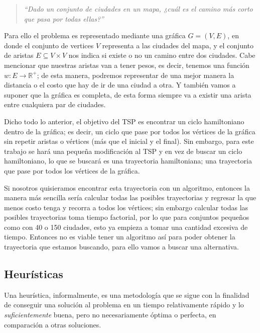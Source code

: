 \documentclass{article}
\newcommand{\tit}[1]{\textit{#1}}
\begin{document}
  \begin{quote}
    \tit{``Dado un conjunto de ciudades en un mapa, ¿cuál es el camino 
      más corto que pasa por todas ellas?''}
  \end{quote}

  Para ello el problema es representado mediante una gráfica $G = (V, E)$, 
  en donde  el conjunto de vertices $V$ representa a las ciudades del mapa, 
  y el conjunto de aristas $E \subseteq V \times V$ nos indica si existe 
  o no un camino entre dos ciudades. Cabe mencionar que nuestras aristas 
  van a tener pesos, es decir, tenemos una función 
  $w: E \rightarrow \mathbb{R}^+$; de esta manera, podremos representar 
  de una mejor manera la distancia o el costo que hay de ir de una ciudad 
  a otra. Y también vamos a suponer que la gráfica es completa, de 
  esta forma siempre va a existir una arista entre cualquiera par de 
  ciudades.

  Dicho todo lo anterior, el objetivo del TSP es encontrar un ciclo 
  hamiltoniano dentro de la gráfica; es decir, un ciclo que pase por 
  todos los vértices de la gráfica sin repetir aristas o vértices 
  (más que el inicial y el final). Sin embargo, para este trabajo se 
  hará una pequeña modificación al TSP y en vez de buscar un ciclo 
  hamiltoniano, lo que se buscará es una trayectoria hamiltoniana; una 
  trayectoria que pase por todos los vértices de la gráfica.

  Si nosotros quisieramos encontrar esta trayectoria con un algoritmo,
  entonces la manera más sencilla sería calcular todas las 
  posibles trayectorias y regresar la que menos costo tenga y 
  recorra a todos los vértices; sin embargo calcular todas las posibles 
  trayectorias toma tiempo factorial, por lo que para conjuntos pequeños 
  como con 40 o 150 ciudades, esto ya empieza a tomar una cantidad 
  excesiva de tiempo. Entonces no es viable tener un algoritmo así para 
  poder obtener la trayectoria que estamos buscando, para ello vamos 
  a buscar una alternativa.

  \subsection{Heurísticas} \label{heuristic}
  Una heurística, informalmente, es una metodología que se sigue con 
  la finalidad de conseguir una solución al problema en un tiempo 
  relativamente rápido y lo \tit{suficientemente} buena, pero 
  no necesariamente óptima o perfecta, en comparación a otras 
  soluciones.
\end{document}
